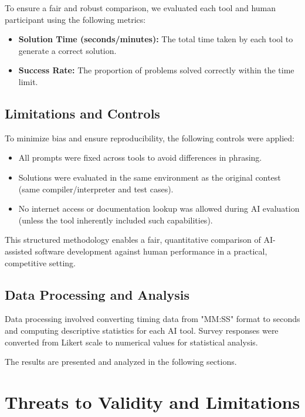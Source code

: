 \documentclass[conference]{IEEEtran}
\begin{document}
To ensure a fair and robust comparison, we evaluated each tool and human participant using the following metrics:

\begin{itemize}
    \item \textbf{Solution Time (seconds/minutes):} The total time taken by each tool to generate a correct solution.
    \item \textbf{Success Rate:} The proportion of problems solved correctly within the time limit.

\end{itemize}



\subsection{Limitations and Controls}

To minimize bias and ensure reproducibility, the following controls were applied:

\begin{itemize}
    \item All prompts were fixed across tools to avoid differences in phrasing.
    \item Solutions were evaluated in the same environment as the original contest (same compiler/interpreter and test cases).
    \item No internet access or documentation lookup was allowed during AI evaluation (unless the tool inherently included such capabilities).
\end{itemize}

This structured methodology enables a fair, quantitative comparison of AI-assisted software development against human performance in a practical, competitive setting.

\subsection{Data Processing and Analysis}

Data processing involved converting timing data from "MM:SS" format to seconds and computing descriptive statistics for each AI tool. Survey responses were converted from Likert scale to numerical values for statistical analysis.

The results are presented and analyzed in the following sections.

\section{Threats to Validity and Limitations}
\end{document}
